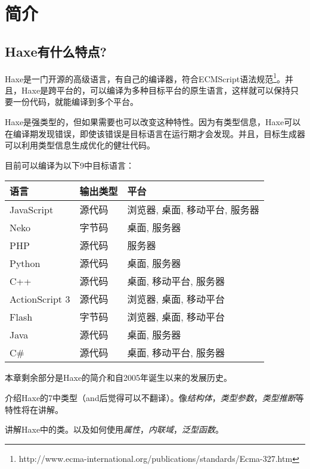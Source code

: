 \chapter{简介}
\label{introduction}

\section{Haxe有什么特点?}
\label{introduction-what-is-haxe}

Haxe是一门开源的高级语言，有自己的编译器，符合ECMScript语法规范\footnote{http://www.ecma-international.org/publications/standards/Ecma-327.htm}。并且，Haxe是跨平台的，可以编译为多种目标平台的原生语言，这样就可以保持只要一份代码，就能编译到多个平台。

Haxe是强类型的，但如果需要也可以改变这种特性。因为有类型信息，Haxe可以在编译期发现错误，即使该错误是目标语言在运行期才会发现。并且，目标生成器可以利用类型信息生成优化的健壮代码。

目前可以编译为以下9中目标语言：

\begin{center}
\begin{tabular}{| l | l | l |}
	\hline
	语言 & 输出类型 & 平台 \\ \hline
	JavaScript & 源代码 & 浏览器, 桌面, 移动平台, 服务器 \\
	Neko & 字节码 & 桌面, 服务器 \\
	PHP & 源代码 & 服务器 \\
	Python & 源代码 & 桌面, 服务器 \\
	C++ & 源代码 & 桌面, 移动平台, 服务器 \\
	ActionScript 3 & 源代码 & 浏览器, 桌面, 移动平台 \\
	Flash & 字节码 & 浏览器, 桌面, 移动平台 \\ 
	Java & 源代码 & 桌面, 服务器 \\
	C\# & 源代码 & 桌面, 移动平台, 服务器 \\ \hline
\end{tabular}
\end{center}

本章剩余部分是Haxe的简介和自2005年诞生以来的发展历史。

 介绍Haxe的7中类型（and后觉得可以不翻译）。像\emph{结构体}，\emph{类型参数}，\emph{类型推断}等特性将在讲解。

讲解Haxe中的类。以及如何使用\emph{属性}，\emph{内联域}，\emph{泛型函数}。

